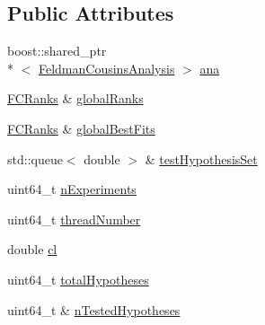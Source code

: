 \subsection*{Public Attributes}
\begin{DoxyCompactItemize}
\item 
boost\-::shared\-\_\-ptr\\*
$<$ \hyperlink{classFeldmanCousinsAnalysis}{Feldman\-Cousins\-Analysis} $>$ \hyperlink{structFCThreadData_aab12c7f409e8e59d773d931a4d0b8187}{ana}
\item 
\hyperlink{classFCRanks}{F\-C\-Ranks} \& \hyperlink{structFCThreadData_afdceefad89e168d411041e126fa48a0c}{global\-Ranks}
\item 
\hyperlink{classFCRanks}{F\-C\-Ranks} \& \hyperlink{structFCThreadData_a8a5d6203aab57c1c05f4d6a2fa549344}{global\-Best\-Fits}
\item 
std\-::queue$<$ double $>$ \& \hyperlink{structFCThreadData_a74bbf1a21613e4c77e011a14c1f26c6a}{test\-Hypothesis\-Set}
\item 
uint64\-\_\-t \hyperlink{structFCThreadData_a721d95b6dbaeae9dd9a1772794cbc2b2}{n\-Experiments}
\item 
uint64\-\_\-t \hyperlink{structFCThreadData_aff011a8ec29fb8962da9474440525374}{thread\-Number}
\item 
double \hyperlink{structFCThreadData_a11a41bb60670a5b8a13b3c9dd961d0d0}{cl}
\item 
uint64\-\_\-t \hyperlink{structFCThreadData_a7243be9f8ba86b1a9f3e6a24b69adfb2}{total\-Hypotheses}
\item 
uint64\-\_\-t \& \hyperlink{structFCThreadData_ab907b43fdcbc5b14b65cd2ca79306806}{n\-Tested\-Hypotheses}
\end{DoxyCompactItemize}


